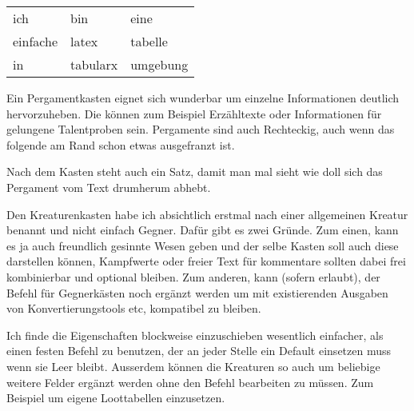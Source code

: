 \documentclass{Ilaris}
\begin{document}
\begin{tabularx}{\linewidth}{X X X}
    ich      & bin      & eine     \\
    einfache & latex    & tabelle  \\
    in       & tabularx & umgebung \\
\end{tabularx}


Ein Pergamentkasten eignet sich wunderbar um einzelne Informationen deutlich hervorzuheben. Die können zum Beispiel Erzähltexte oder Informationen für gelungene Talentproben sein. Pergamente sind auch Rechteckig, auch wenn das folgende am Rand schon etwas ausgefranzt ist.


Nach dem Kasten steht auch ein Satz, damit man mal sieht wie doll sich das Pergament vom Text drumherum abhebt.
\spaltenumbruch

Den Kreaturenkasten habe ich absichtlich erstmal nach einer allgemeinen Kreatur benannt und nicht einfach Gegner. Dafür gibt es zwei Gründe. Zum einen, kann es ja auch freundlich gesinnte Wesen geben und der selbe Kasten soll auch diese darstellen können, Kampfwerte oder freier Text für kommentare sollten dabei frei kombinierbar und optional bleiben. Zum anderen, kann (sofern erlaubt), der Befehl für Gegnerkästen noch ergänzt werden um mit existierenden Ausgaben von Konvertierungstools etc, kompatibel zu bleiben.



Ich finde die Eigenschaften blockweise einzuschieben wesentlich einfacher, als einen festen Befehl zu benutzen, der an jeder Stelle ein Default einsetzen muss wenn sie Leer bleibt. Ausserdem können die Kreaturen so auch um beliebige weitere Felder ergänzt werden ohne den Befehl bearbeiten zu müssen. Zum Beispiel um eigene Loottabellen einzusetzen.
\end{document}
